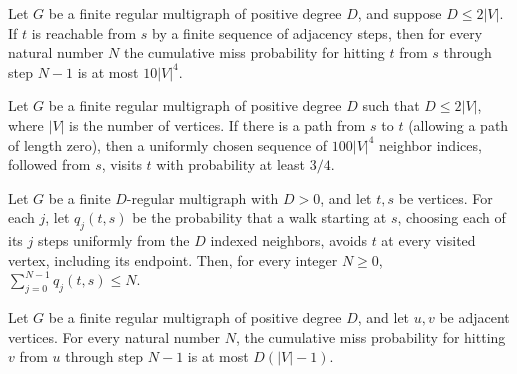 \begin{theorem}
\label{Randomized.RegularMultigraph.hitTime_le_ten_mul_pow_four}
\leanok
{}
Let $G$ be a finite regular multigraph of positive degree $D$, and suppose $D\le 2|V|$.
If $t$ is reachable from $s$ by a finite sequence of adjacency steps, then for every
natural number $N$ the cumulative miss probability for hitting $t$ from $s$ through step
$N-1$ is at most $10|V|^4$.
\end{theorem}

\begin{theorem}
\label{Randomized.RegularMultigraph.three_quarters_le_hitProb}
\leanok
{}
Let $G$ be a finite regular multigraph of positive degree $D$ such that $D\leq 2|V|$,
where $|V|$ is the number of vertices. If there is a path from $s$ to $t$ (allowing a
path of length zero), then a uniformly chosen sequence of $100|V|^4$ neighbor indices,
followed from $s$, visits $t$ with probability at least $3/4$.
\end{theorem}

\begin{theorem}
\label{Randomized.RegularMultigraph.hitTime_le_trunc}
\leanok
{}
Let $G$ be a finite $D$-regular multigraph with $D>0$, and let $t,s$ be vertices. For
each $j$, let $q_j(t,s)$ be the probability that a walk starting at $s$, choosing each
of its $j$ steps uniformly from the $D$ indexed neighbors, avoids $t$ at every visited
vertex, including its endpoint. Then, for every integer $N\ge 0$,
$\sum_{j=0}^{N-1}q_j(t,s)\le N$.
\end{theorem}

\begin{theorem}
\label{Randomized.RegularMultigraph.hitTime_le_of_adj}
\leanok
{}
Let $G$ be a finite regular multigraph of positive degree $D$, and let $u,v$ be adjacent
vertices. For every natural number $N$, the cumulative miss probability for hitting $v$
from $u$ through step $N-1$ is at most $D(|V|-1)$.
\end{theorem}

